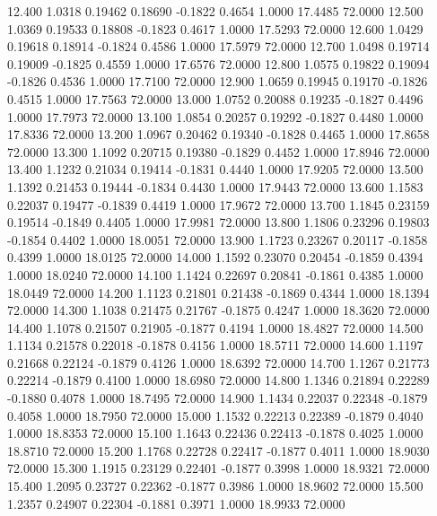   12.400   1.0318   0.19462   0.18690  -0.1822   0.4654   1.0000  17.4485  72.0000
  12.500   1.0369   0.19533   0.18808  -0.1823   0.4617   1.0000  17.5293  72.0000
  12.600   1.0429   0.19618   0.18914  -0.1824   0.4586   1.0000  17.5979  72.0000
  12.700   1.0498   0.19714   0.19009  -0.1825   0.4559   1.0000  17.6576  72.0000
  12.800   1.0575   0.19822   0.19094  -0.1826   0.4536   1.0000  17.7100  72.0000
  12.900   1.0659   0.19945   0.19170  -0.1826   0.4515   1.0000  17.7563  72.0000
  13.000   1.0752   0.20088   0.19235  -0.1827   0.4496   1.0000  17.7973  72.0000
  13.100   1.0854   0.20257   0.19292  -0.1827   0.4480   1.0000  17.8336  72.0000
  13.200   1.0967   0.20462   0.19340  -0.1828   0.4465   1.0000  17.8658  72.0000
  13.300   1.1092   0.20715   0.19380  -0.1829   0.4452   1.0000  17.8946  72.0000
  13.400   1.1232   0.21034   0.19414  -0.1831   0.4440   1.0000  17.9205  72.0000
  13.500   1.1392   0.21453   0.19444  -0.1834   0.4430   1.0000  17.9443  72.0000
  13.600   1.1583   0.22037   0.19477  -0.1839   0.4419   1.0000  17.9672  72.0000
  13.700   1.1845   0.23159   0.19514  -0.1849   0.4405   1.0000  17.9981  72.0000
  13.800   1.1806   0.23296   0.19803  -0.1854   0.4402   1.0000  18.0051  72.0000
  13.900   1.1723   0.23267   0.20117  -0.1858   0.4399   1.0000  18.0125  72.0000
  14.000   1.1592   0.23070   0.20454  -0.1859   0.4394   1.0000  18.0240  72.0000
  14.100   1.1424   0.22697   0.20841  -0.1861   0.4385   1.0000  18.0449  72.0000
  14.200   1.1123   0.21801   0.21438  -0.1869   0.4344   1.0000  18.1394  72.0000
  14.300   1.1038   0.21475   0.21767  -0.1875   0.4247   1.0000  18.3620  72.0000
  14.400   1.1078   0.21507   0.21905  -0.1877   0.4194   1.0000  18.4827  72.0000
  14.500   1.1134   0.21578   0.22018  -0.1878   0.4156   1.0000  18.5711  72.0000
  14.600   1.1197   0.21668   0.22124  -0.1879   0.4126   1.0000  18.6392  72.0000
  14.700   1.1267   0.21773   0.22214  -0.1879   0.4100   1.0000  18.6980  72.0000
  14.800   1.1346   0.21894   0.22289  -0.1880   0.4078   1.0000  18.7495  72.0000
  14.900   1.1434   0.22037   0.22348  -0.1879   0.4058   1.0000  18.7950  72.0000
  15.000   1.1532   0.22213   0.22389  -0.1879   0.4040   1.0000  18.8353  72.0000
  15.100   1.1643   0.22436   0.22413  -0.1878   0.4025   1.0000  18.8710  72.0000
  15.200   1.1768   0.22728   0.22417  -0.1877   0.4011   1.0000  18.9030  72.0000
  15.300   1.1915   0.23129   0.22401  -0.1877   0.3998   1.0000  18.9321  72.0000
  15.400   1.2095   0.23727   0.22362  -0.1877   0.3986   1.0000  18.9602  72.0000
  15.500   1.2357   0.24907   0.22304  -0.1881   0.3971   1.0000  18.9933  72.0000
